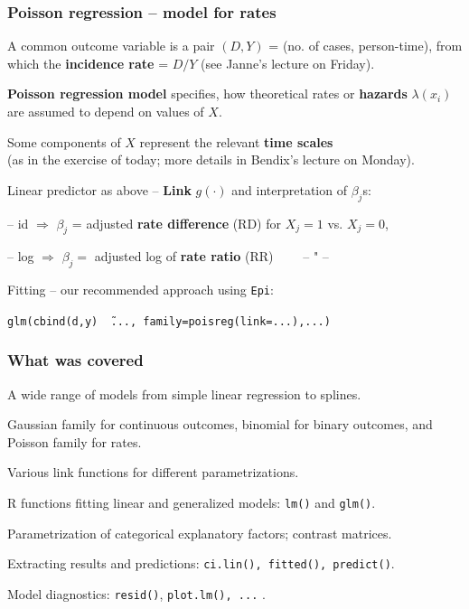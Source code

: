 \documentclass[12pt,dvipsnames,t,handout%
,aspectratio=169%
]{beamer}
\begin{document}
\begin{frame}
\frametitle{Poisson regression -- model for rates}
\bi
\item
A common outcome variable is
a pair $(D, Y)$ = (no. of cases, person-time), from
which the \textbf{incidence rate} = $D/Y$ 
(see Janne's lecture on Friday).
\medskip
\item
\textbf{Poisson regression model} specifies, how theoretical rates
or \textbf{hazards} $\lambda(x_i)$ are assumed 
to depend on values of $X$.
\medskip
\item
Some components of $X$ represent the relevant \textbf{time scales} \\
(as in the exercise of today; 
more details in Bendix's lecture on Monday).
\medskip
\item
Linear predictor as above -- 
\textbf{Link} $g(\cdot)$ and interpretation of $\beta_j$s:
\bi
{\normalsize 
\item[--]  id $\Rightarrow$ $\beta_j$ = 
adjusted \textbf{rate difference} (RD)  for $X_j=1$ vs. $X_j=0$,
\item[--] log $\Rightarrow$ $\beta_j=$ 
adjusted log of \textbf{rate ratio} (RR) \ \ \ \ -- " --
}
\ei
\medskip
\item
Fitting -- our recommended approach using \texttt{Epi}:
\begin{center}
\texttt{glm(cbind(d,y) \~\ ..., family=poisreg(link=...),...)}
\end{center}

\ei

\end{frame}


% 
\begin{frame}
\frametitle{What was covered}

\bi
\item A wide range of models from simple linear regression to splines.
\medskip
\item
Gaussian family for continuous outcomes, binomial for binary outcomes,
and Poisson family for rates.
\medskip
\item
Various link functions for different parametrizations. 
\medskip
\item
R functions fitting linear and generalized models: 
\texttt{lm()} and \texttt{glm()}.
\medskip
\item
Parametrization of categorical explanatory factors; contrast matrices.
\medskip
\item
Extracting results and predictions: \texttt{ci.lin(), fitted(), predict()}. 
\medskip
\item
Model diagnostics:  \texttt{resid()}, \texttt{plot.lm(), ...} .
\ei

\end{frame}
\end{document}
